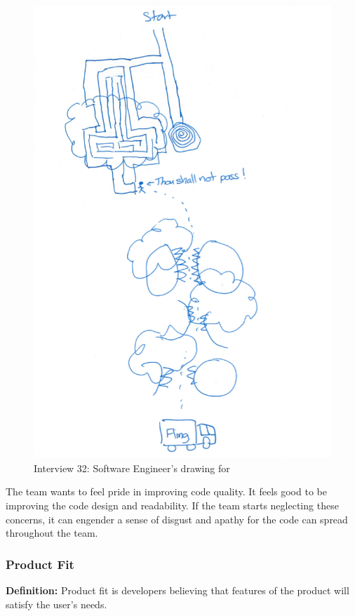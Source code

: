 \begin{figure}[htbp]
\centering
\includegraphics[width=\oneColumnWidth{}]{drawings/2016_09_29.png}
\caption{Interview 32: Software Engineer's drawing for }
\label{Interview32}
\end{figure}


The team wants to feel pride in improving code quality.  It feels good to be improving the code design and readability. If the team starts neglecting these concerns, it can engender a sense of disgust and apathy for the code can spread throughout the team.

\subsubsection{Product Fit}
\textbf{Definition:} Product fit is developers believing that features of the product will satisfy the user’s needs.

